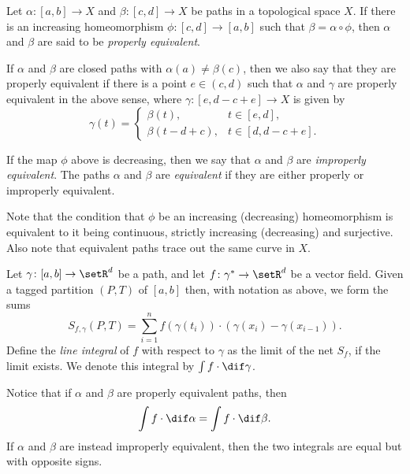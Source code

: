 \documentclass[article, a4paper, 11pt, oneside]{memoir}
\numberwithin{equation}{chapter}
\begin{document}
\begin{definition}
	Let $\alpha \colon [a,b] \to X$ and $\beta \colon [c,d] \to X$ be paths in a topological space $X$. If there is an increasing homeomorphism $\phi \colon [c,d] \to [a,b]$ such that $\beta = \alpha \circ \phi$, then $\alpha$ and $\beta$ are said to be \emph{properly equivalent}.

	If $\alpha$ and $\beta$ are closed paths with $\alpha(a) \neq \beta(c)$, then we also say that they are properly equivalent if there is a point $e \in (c,d)$ such that $\alpha$ and $\gamma$ are properly equivalent in the above sense, where $\gamma \colon [e, d-c+e] \to X$ is given by
	\begin{equation*}
		\gamma(t) =
		\begin{cases}
			\beta(t), & t \in [e,d], \\
			\beta(t-d+c), & t \in [d,d-c+e].
		\end{cases}
	\end{equation*}
	
	If the map $\phi$ above is decreasing, then we say that $\alpha$ and $\beta$ are \emph{improperly equivalent}. The paths $\alpha$ and $\beta$ are \emph{equivalent} if they are either properly or improperly equivalent.
\end{definition}
%
Note that the condition that $\phi$ be an increasing (decreasing) homeomorphism is equivalent to it being continuous, strictly increasing (decreasing) and surjective. Also note that equivalent paths trace out the same curve in $X$.

\begin{definition}
	Let $\gamma \colon [a,b] \to \setR^d$ be a path, and let $f \colon \gamma^* \to \setR^d$ be a vector field. Given a tagged partition $(P,T)$ of $[a,b]$ then, with notation as above, we form the sums
    \begin{equation*}
        S_{f,\gamma}(P,T)
            = \sum_{i=1}^n f(\gamma(t_i)) \cdot (\gamma(x_i) - \gamma(x_{i-1})).
    \end{equation*}
    Define the \emph{line integral} of $f$ with respect to $\gamma$ as the limit of the net $S_f$, if the limit exists. We denote this integral by $\int f \cdot \dif\gamma$.
\end{definition}
%
Notice that if $\alpha$ and $\beta$ are properly equivalent paths, then
%
\begin{equation*}
	\int f \cdot \dif\alpha = \int f \cdot \dif\beta.
\end{equation*}
%
If $\alpha$ and $\beta$ are instead improperly equivalent, then the two integrals are equal but with opposite signs.
\end{document}

